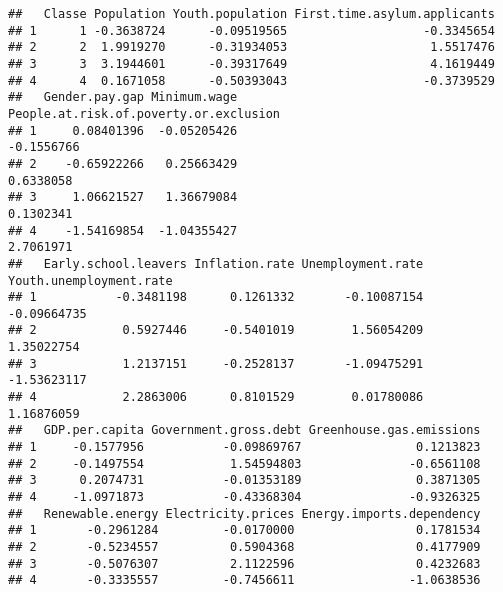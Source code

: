 \documentclass[
]{article}
\begin{document}
\begin{verbatim}
##   Classe Population Youth.population First.time.asylum.applicants
## 1      1 -0.3638724      -0.09519565                   -0.3345654
## 2      2  1.9919270      -0.31934053                    1.5517476
## 3      3  3.1944601      -0.39317649                    4.1619449
## 4      4  0.1671058      -0.50393043                   -0.3739529
##   Gender.pay.gap Minimum.wage People.at.risk.of.poverty.or.exclusion
## 1     0.08401396  -0.05205426                             -0.1556766
## 2    -0.65922266   0.25663429                              0.6338058
## 3     1.06621527   1.36679084                              0.1302341
## 4    -1.54169854  -1.04355427                              2.7061971
##   Early.school.leavers Inflation.rate Unemployment.rate Youth.unemployment.rate
## 1           -0.3481198      0.1261332       -0.10087154             -0.09664735
## 2            0.5927446     -0.5401019        1.56054209              1.35022754
## 3            1.2137151     -0.2528137       -1.09475291             -1.53623117
## 4            2.2863006      0.8101529        0.01780086              1.16876059
##   GDP.per.capita Government.gross.debt Greenhouse.gas.emissions
## 1     -0.1577956           -0.09869767                0.1213823
## 2     -0.1497554            1.54594803               -0.6561108
## 3      0.2074731           -0.01353189                0.3871305
## 4     -1.0971873           -0.43368304               -0.9326325
##   Renewable.energy Electricity.prices Energy.imports.dependency
## 1       -0.2961284         -0.0170000                 0.1781534
## 2       -0.5234557          0.5904368                 0.4177909
## 3       -0.5076307          2.1122596                 0.4232683
## 4       -0.3335557         -0.7456611                -1.0638536
\end{verbatim}
\end{document}
